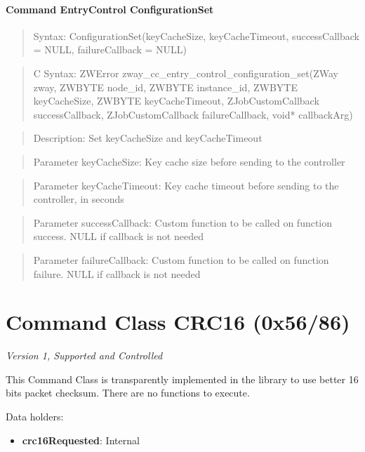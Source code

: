 \paragraph{Command EntryControl ConfigurationSet}
\begin{quote}Syntax: ConfigurationSet(keyCacheSize, keyCacheTimeout, successCallback = NULL, failureCallback = NULL)\end{quote}
\begin{quote}C Syntax: ZWError zway\_cc\_entry\_control\_configuration\_set(ZWay zway, ZWBYTE node\_id, ZWBYTE instance\_id, ZWBYTE keyCacheSize, ZWBYTE keyCacheTimeout, ZJobCustomCallback successCallback, ZJobCustomCallback failureCallback, void* callbackArg)\end{quote}
\begin{quote}Description: Set keyCacheSize and keyCacheTimeout\end{quote}
\begin{quote}Parameter keyCacheSize: Key cache size before sending to the controller\end{quote}
\begin{quote}Parameter keyCacheTimeout: Key cache timeout before sending to the controller, in seconds\end{quote}
\begin{quote}Parameter successCallback: Custom function to be called on function success. NULL if callback is not needed\end{quote}
\begin{quote}Parameter failureCallback: Custom function to be called on function failure. NULL if callback is not needed\end{quote}



\section{Command Class CRC16 (0x56/86)}

\textit{Version 1, Supported and Controlled}
\newline

This Command Class is transparently implemented in the library to use better 16 bits packet checksum. There are no functions to execute.
\newline

\noindent
Data holders:

\begin{itemize}
\item \textbf{crc16Requested}: Internal
\end{itemize}


